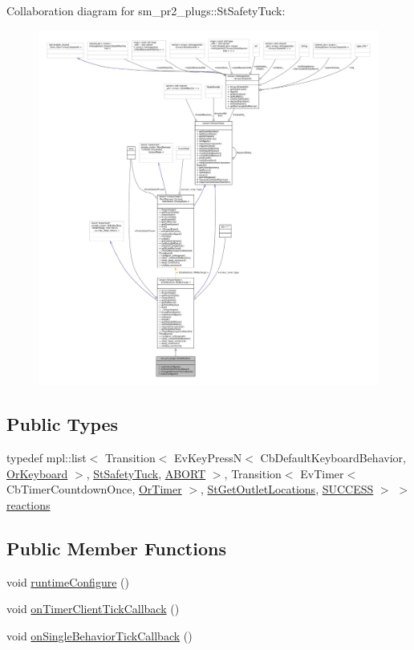 Collaboration diagram for sm\+\_\+pr2\+\_\+plugs\+:\+:St\+Safety\+Tuck\+:
\nopagebreak
\begin{figure}[H]
\begin{center}
\leavevmode
\includegraphics[width=350pt]{structsm__pr2__plugs_1_1StSafetyTuck__coll__graph}
\end{center}
\end{figure}
\subsection*{Public Types}
\begin{DoxyCompactItemize}
\item 
typedef mpl\+::list$<$ Transition$<$ Ev\+Key\+PressN$<$ Cb\+Default\+Keyboard\+Behavior, \hyperlink{classsm__pr2__plugs_1_1OrKeyboard}{Or\+Keyboard} $>$, \hyperlink{structsm__pr2__plugs_1_1StSafetyTuck}{St\+Safety\+Tuck}, \hyperlink{classABORT}{A\+B\+O\+RT} $>$, Transition$<$ Ev\+Timer$<$ Cb\+Timer\+Countdown\+Once, \hyperlink{classsm__pr2__plugs_1_1OrTimer}{Or\+Timer} $>$, \hyperlink{structsm__pr2__plugs_1_1StGetOutletLocations}{St\+Get\+Outlet\+Locations}, \hyperlink{classSUCCESS}{S\+U\+C\+C\+E\+SS} $>$ $>$ \hyperlink{structsm__pr2__plugs_1_1StSafetyTuck_a6162ef008d6b48278427d85e91a926c8}{reactions}
\end{DoxyCompactItemize}
\subsection*{Public Member Functions}
\begin{DoxyCompactItemize}
\item 
void \hyperlink{structsm__pr2__plugs_1_1StSafetyTuck_ae58dc354ff826ff1a124376272f75cc9}{runtime\+Configure} ()
\item 
void \hyperlink{structsm__pr2__plugs_1_1StSafetyTuck_aa1082813087c8201894aa1047ecf8a9b}{on\+Timer\+Client\+Tick\+Callback} ()
\item 
void \hyperlink{structsm__pr2__plugs_1_1StSafetyTuck_ac3d9dc48854336a560515bb30c7d9dd9}{on\+Single\+Behavior\+Tick\+Callback} ()
\end{DoxyCompactItemize}

